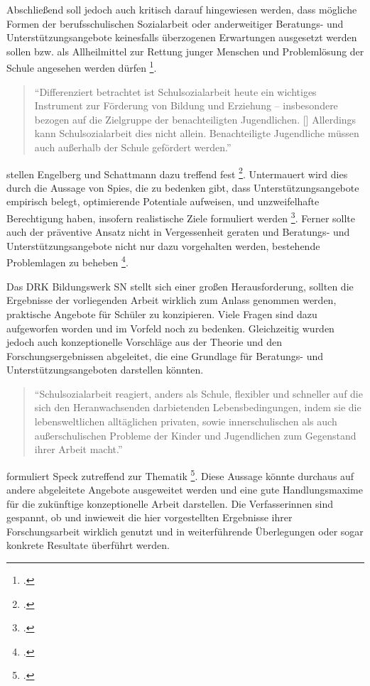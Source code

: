 Abschließend soll jedoch auch kritisch darauf hingewiesen werden, dass mögliche Formen der berufsschulischen Sozialarbeit oder anderweitiger Beratungs- und Unterstützungsangebote keinesfalls überzogenen Erwartungen ausgesetzt werden sollen bzw. als Allheilmittel zur Rettung junger Menschen und Problemlösung der Schule angesehen werden dürfen \footcite[vgl.][14]{Engelberg2011}.
\begin{quotation}
\noindent
"`Differenziert betrachtet ist Schulsozialarbeit heute ein wichtiges Instrument zur Förderung von Bildung und Erziehung -- insbesondere bezogen auf die Zielgruppe der benachteiligten Jugendlichen. [\punkte] Allerdings kann Schulsozialarbeit dies nicht allein. Benachteiligte Jugendliche müssen auch außerhalb der Schule gefördert werden."'
\end{quotation}
\noindent
[\punkte] stellen Engelberg und Schattmann dazu treffend fest \footcite[14]{Engelberg2011}. Untermauert wird dies durch die Aussage von Spies, die zu bedenken gibt, dass Unterstützungsangebote empirisch belegt, optimierende Potentiale aufweisen, und unzweifelhafte Berechtigung haben, insofern realistische Ziele formuliert werden \footcite[vgl.][16]{Spies2013}. Ferner sollte auch der präventive Ansatz nicht in Vergessenheit geraten und Beratungs- und Unterstützungsangebote nicht nur dazu vorgehalten werden, bestehende Problemlagen zu beheben \footcite[vgl.][14]{Engelberg2011}. 

Das DRK Bildungswerk SN stellt sich einer großen Herausforderung, sollten die Ergebnisse der vorliegenden Arbeit wirklich zum Anlass genommen werden, praktische Angebote für Schüler zu konzipieren. Viele Fragen sind dazu aufgeworfen worden und im Vorfeld noch zu bedenken. Gleichzeitig wurden jedoch auch konzeptionelle Vorschläge aus der Theorie und den Forschungsergebnissen abgeleitet, die eine Grundlage für Beratungs- und Unterstützungsangeboten darstellen könnten. 

\begin{quotation}
\noindent
"`Schulsozialarbeit reagiert, anders als Schule, flexibler und schneller auf die sich den Heranwachsenden darbietenden Lebensbedingungen, indem sie die lebensweltlichen alltäglichen privaten, sowie innerschulischen als auch außerschulischen Probleme der Kinder und Jugendlichen zum Gegenstand ihrer Arbeit macht."'
\end{quotation}

\noindent
[\punkte] formuliert Speck zutreffend zur Thematik \footcite[75]{Speck2007}. Diese Aussage könnte durchaus auf andere abgeleitete Angebote ausgeweitet werden und eine gute Handlungsmaxime für die zukünftige konzeptionelle Arbeit darstellen. Die Verfasserinnen sind gespannt, ob und inwieweit die hier vorgestellten Ergebnisse ihrer Forschungsarbeit wirklich genutzt und in weiterführende Überlegungen oder sogar konkrete Resultate überführt werden. 
